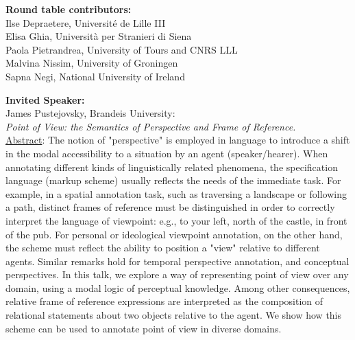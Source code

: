 \documentclass[11pt]{article}
\begin{document}
\begin{description}
\vspace{3mm}
\item{\bf Round table contributors:}\vspace{2mm} \\
Ilse Depraetere, Universit\'{e} de Lille III\\ 
Elisa Ghia, Universit\`{a} per Stranieri di Siena\\
Paola Pietrandrea, University of Tours and CNRS LLL\\
Malvina Nissim, University of Groningen\\
Sapna Negi, National University of Ireland\\


\vspace{3mm}
\item{\bf Invited Speaker:}\vspace{2mm} \\
{James Pustejovsky, Brandeis University: \\ 
\textit{Point of View: the Semantics of Perspective and Frame of Reference.}}\vspace{0.2cm} \\
\underline{Abstract}: The notion of "perspective" is employed in language to introduce a
shift in the modal accessibility to a situation by an agent
(speaker/hearer). When annotating different kinds of linguistically
related phenomena, the specification language (markup scheme) usually
reflects the needs of the immediate task. For example, in a spatial
annotation task, such as traversing a landscape or following a path,
distinct frames of reference must be distinguished in order to
correctly interpret the language of viewpoint: e.g., to your left,
north of the castle, in front of the pub. For personal or ideological
viewpoint annotation, on the other hand, the scheme must reflect the
ability to position a "view" relative to different agents. Similar
remarks hold for temporal perspective annotation, and conceptual
perspectives. In this talk, we explore a way of representing point of
view over any domain, using a modal logic of perceptual
knowledge. Among other consequences, relative frame of reference
expressions are interpreted as the composition of relational
statements about two objects relative to the agent. We show how this
scheme can be used to annotate point of view in diverse domains. 





\end{description}
\end{document}
